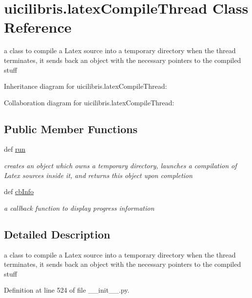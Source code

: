 \hypertarget{classuicilibris_1_1latexCompileThread}{\section{uicilibris.\-latex\-Compile\-Thread \-Class \-Reference}
\label{classuicilibris_1_1latexCompileThread}
}


a class to compile a \-Latex source into a temporary directory when the thread terminates, it sends back an object with the necessary pointers to the compiled stuff  




\-Inheritance diagram for uicilibris.\-latex\-Compile\-Thread\-:


\-Collaboration diagram for uicilibris.\-latex\-Compile\-Thread\-:
\subsection*{\-Public \-Member \-Functions}
\begin{DoxyCompactItemize}
\item 
def \hyperlink{classuicilibris_1_1latexCompileThread_a96c9b7bd10cb6c01422d7f1c11f7b3e1}{run}
\begin{DoxyCompactList}\small\item\em creates an object which owns a temporary directory, launches a compilation of \-Latex sources inside it, and returns this object upon completion \end{DoxyCompactList}\item 
def \hyperlink{classuicilibris_1_1latexCompileThread_af1ca34e7c4db9ef4eabb1c3d660fa032}{cb\-Info}
\begin{DoxyCompactList}\small\item\em a callback function to display progress information \end{DoxyCompactList}\end{DoxyCompactItemize}


\subsection{\-Detailed \-Description}
a class to compile a \-Latex source into a temporary directory when the thread terminates, it sends back an object with the necessary pointers to the compiled stuff 

\-Definition at line 524 of file \-\_\-\-\_\-init\-\_\-\-\_\-.\-py.



